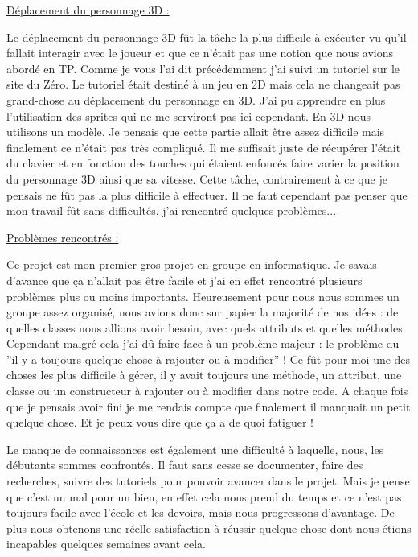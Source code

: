 \documentclass{article}
\begin{document}
\underline{Déplacement du personnage 3D :}
\newline
\par
Le déplacement du personnage 3D fût la tâche la plus difficile à exécuter vu qu'il fallait interagir avec le joueur et que ce n'était pas une notion que nous avions abordé en TP. Comme je vous l'ai dit précédemment j'ai suivi un tutoriel sur le site du Zéro. Le tutoriel était destiné à un jeu en 2D mais cela ne changeait pas grand-chose au déplacement du personnage en 3D. J'ai pu apprendre en plus l'utilisation des sprites qui ne me serviront pas ici cependant. En 3D nous utilisons un modèle. Je pensais que cette partie allait être assez difficile mais finalement ce n'était pas très compliqué. Il me suffisait juste de récupérer l'était du clavier et en fonction des touches qui étaient enfoncés faire varier la position du personnage 3D ainsi que sa vitesse. Cette tâche, contrairement à ce que je pensais ne fût pas la plus difficile à effectuer.
Il ne faut cependant pas penser que mon travail fût sans difficultés, j'ai rencontré quelques problèmes... 
\newline

\par
\underline{Problèmes rencontrés :}
\newline
\par
Ce projet est mon premier gros projet en groupe en informatique. Je savais d'avance que ça n'allait pas être facile et j'ai en effet rencontré plusieurs problèmes plus ou moins importants. Heureusement pour nous nous sommes un groupe assez organisé, nous avions donc sur papier la majorité de nos idées : de quelles classes nous allions avoir besoin, avec quels attributs et quelles méthodes. Cependant malgré cela j'ai dû faire face à un problème majeur : le problème du ''il y a toujours quelque chose à rajouter ou à modifier'' ! Ce fût pour moi une des choses les plus difficile à gérer, il y avait toujours une méthode, un attribut, une classe ou un constructeur à rajouter ou à modifier dans notre code. A chaque fois que je pensais avoir fini je me rendais compte que finalement il manquait un petit quelque chose. Et je peux vous dire que ça a de quoi fatiguer !
\newline

\par
Le manque de connaissances est également une difficulté à laquelle, nous, les débutants sommes confrontés. Il faut sans cesse se documenter, faire des recherches, suivre des tutoriels pour pouvoir avancer dans le projet. Mais je pense que c'est un mal pour un bien, en effet cela nous prend du temps et ce n'est pas toujours facile avec l'école et les devoirs, mais nous progressons d'avantage. De plus nous obtenons une réelle satisfaction à réussir quelque chose dont nous étions incapables quelques semaines avant cela.
\newline
\end{document}
